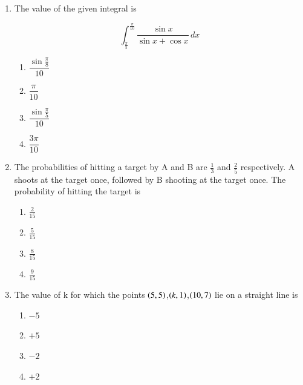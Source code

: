 \documentclass[journal,12pt,onecolumn]{IEEEtran}
\theoremstyle{remark}
\begin{document}
\begin{enumerate}
\hfill{}
\begin{multicols}{4}
\begin{enumerate}
\item $1$ in $556$
\item $1$ in $785$
\item $1$ in $833$
\item $1$ in $1024$
\end{enumerate}
\end{multicols}

\item The value of the given integral is

\[
\int_{\frac{\pi}{5}}^{\frac{\pi}{10}} \frac{\sin x}{\sin x + \cos x} \, dx
\]

\hfill{}
\begin{multicols}{4}
\begin{enumerate}
\item $\dfrac{\sin \frac{\pi}{8}}{10}$
\item $\dfrac{\pi}{10}$
\item $\dfrac{\sin \frac{\pi}{5}}{10}$
\item $\dfrac{3\pi}{10}$
\end{enumerate}
\end{multicols}

\item  The probabilities of hitting a target by A and B are $\frac{1}{3}$ and $\frac{2}{5}$ respectively. A shoots at the target
once, followed by B shooting at the target once. The probability of hitting the target is

\hfill{}
\begin{multicols}{4}
\begin{enumerate}
\item $\frac{2}{15}$
\item $\frac{5}{15}$
\item $\frac{8}{15}$
\item $\frac{9}{15}$
\end{enumerate}
\end{multicols}

\item  The value of k for which the points $\left(5,5\right)$,$\left(k,1\right)$,$\left(10,7\right)$ lie on a straight line is

\hfill{}
\begin{multicols}{4}
\begin{enumerate}
\item $-5$
\item $+5$
\item $-2$
\item $+2$
\end{enumerate}
\end{multicols}


\end{enumerate}
\end{document}
